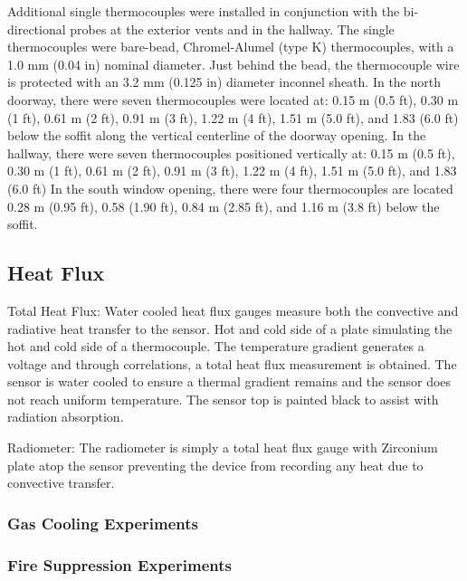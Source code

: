 \documentclass[12pt,oneside]{book}
\begin{document}
Additional single thermocouples were installed in conjunction with the bi-directional probes at the exterior vents and in the hallway.  The single thermocouples were bare-bead, Chromel-Alumel (type K) thermocouples, with a 1.0 mm (0.04 in) nominal diameter. Just behind the bead, the thermocouple wire is protected with an 3.2 mm (0.125 in) diameter inconnel sheath.  
In the north doorway, there were seven thermocouples were located at: 0.15 m (0.5 ft), 0.30 m (1 ft), 0.61 m (2 ft), 0.91 m (3 ft), 1.22 m (4 ft), 1.51 m (5.0 ft), and 1.83 (6.0 ft) below the soffit along the vertical centerline of the doorway opening.  In the hallway, there were seven thermocouples positioned vertically at: 0.15 m (0.5 ft), 0.30 m (1 ft), 0.61 m (2 ft), 0.91 m (3 ft), 1.22 m (4 ft), 1.51 m (5.0 ft), and 1.83 (6.0 ft)   In the south window opening, there were four thermocouples are located 0.28 m (0.95 ft), 0.58 (1.90 ft), 0.84 m (2.85 ft), and 1.16 m (3.8 ft) below the soffit.  

\subsection{Heat Flux}
\label{subsec:Heat_Flux}

Total Heat Flux:
Water cooled heat flux gauges measure both the convective and radiative heat transfer to the sensor.  Hot and cold side of a plate simulating the hot and cold side of a thermocouple.  The temperature gradient generates a voltage and through correlations, a total heat flux measurement is obtained.  The sensor is water cooled to ensure a thermal gradient remains and the sensor does not reach uniform temperature.  The sensor top is painted black to assist with radiation absorption.

Radiometer:
The radiometer is simply a total heat flux gauge with Zirconium plate atop the sensor preventing the device from recording any heat due to convective transfer.

\subsubsection{Gas Cooling Experiments}
\label{subsubsec:Gas_Cooling_Heat_Flux_Instrumentation}

\subsubsection{Fire Suppression Experiments}
\label{subsubsec:Fire_Suppression_Heat_Flux_Instrumentation}
\end{document}
